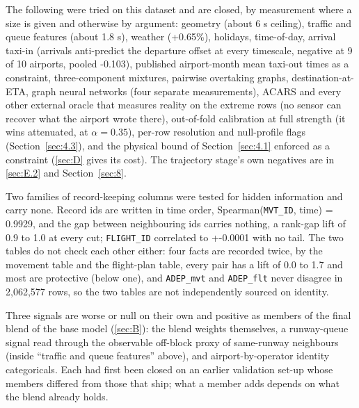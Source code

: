 \documentclass[
  manuscript=article,
  layout=preprint,
  year=2026,
  volume=x,
]{extra/joas}
\begin{document}
The following were tried on this dataset and are closed, by measurement where a size is given and otherwise by argument: geometry (about 6 s ceiling), traffic and queue features (about 1.8 s), weather (+0.65\%), holidays, time-of-day, arrival taxi-in (arrivals anti-predict the departure offset at every timescale, negative at 9 of 10 airports, pooled -0.103), published airport-month mean taxi-out times as a constraint, three-component mixtures, pairwise overtaking graphs, destination-at-ETA, graph neural networks (four separate measurements), ACARS and every other external oracle that measures reality on the extreme rows (no sensor can recover what the airport wrote there), out-of-fold calibration at full strength (it wins attenuated, at $\alpha = 0.35$), per-row resolution and null-profile flags (Section~\ref{sec:4.3}), and the physical bound of Section~\ref{sec:4.1} enforced as a constraint (\ref{sec:D} gives its cost). The trajectory stage's own negatives are in \ref{sec:E.2} and Section~\ref{sec:8}.

Two families of record-keeping columns were tested for hidden information and carry none. Record ids are written in time order, Spearman(\texttt{MVT\_ID}, time) = 0.9929, and the gap between neighbouring ids carries nothing, a rank-gap lift of 0.9 to 1.0 at every cut; \texttt{FLIGHT\_ID} correlated to +-0.0001 with no tail. The two tables do not check each other either: four facts are recorded twice, by the movement table and the flight-plan table, every pair has a lift of 0.0 to 1.7 and most are protective (below one), and \texttt{ADEP\_mvt} and \texttt{ADEP\_flt} never disagree in 2,062,577 rows, so the two tables are not independently sourced on identity.

Three signals are worse or null on their own and positive as members of the final blend of the base model (\ref{sec:B}): the blend weights themselves, a runway-queue signal read through the observable off-block proxy of same-runway neighbours (inside ``traffic and queue features'' above), and airport-by-operator identity categoricals. Each had first been closed on an earlier validation set-up whose members differed from those that ship; what a member adds depends on what the blend already holds.
\end{document}
